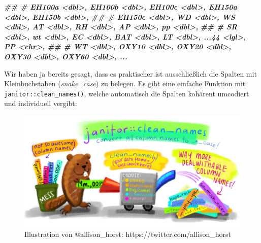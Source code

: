 \documentclass[
]{article}
\newenvironment{Shaded}{\begin{snugshade}}{\end{snugshade}}
\newcommand{\DocumentationTok}[1]{\textcolor[rgb]{0.56,0.35,0.01}{\textbf{\textit{#1}}}}
\begin{document}
\begin{Shaded}
\begin{Highlighting}[]
\DocumentationTok{\#\# \#   EH100a \textless{}dbl\textgreater{}, EH100b \textless{}dbl\textgreater{}, EH100c \textless{}dbl\textgreater{}, EH150a \textless{}dbl\textgreater{}, EH150b \textless{}dbl\textgreater{},}
\DocumentationTok{\#\# \#   EH150c \textless{}dbl\textgreater{}, WD \textless{}dbl\textgreater{}, WS \textless{}dbl\textgreater{}, AT \textless{}dbl\textgreater{}, RH \textless{}dbl\textgreater{}, AP \textless{}dbl\textgreater{}, pp \textless{}dbl\textgreater{},}
\DocumentationTok{\#\# \#   SR \textless{}dbl\textgreater{}, wt \textless{}dbl\textgreater{}, EC \textless{}dbl\textgreater{}, BAT \textless{}dbl\textgreater{}, LT \textless{}dbl\textgreater{}, ...44 \textless{}lgl\textgreater{}, PP \textless{}chr\textgreater{},}
\DocumentationTok{\#\# \#   WT \textless{}dbl\textgreater{}, OXY10 \textless{}dbl\textgreater{}, OXY20 \textless{}dbl\textgreater{}, OXY30 \textless{}dbl\textgreater{}, OXY60 \textless{}dbl\textgreater{}, ...}
\end{Highlighting}
\end{Shaded}

Wir haben ja bereits gesagt, dass es praktischer ist ausschließlich die Spalten mit Kleinbuchstaben (\emph{snake\_case}) zu belegen. Es gibt eine einfache Funktion mit \texttt{janitor::clean\_names()}, welche automatisch die Spalten kohärent umcodiert und individuell vergibt:

\begin{figure}

{\centering \includegraphics[width=1\linewidth]{images/034} 

}

\caption{Illustration von @allison_horst: https://twitter.com/allison_horst}\label{fig:unnamed-chunk-114}
\end{figure}
\end{document}
